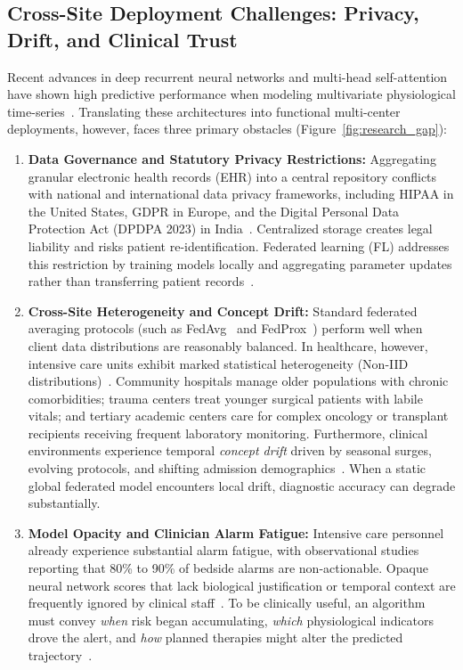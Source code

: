 \documentclass[11pt,a4paper]{article}
\begin{document}
\subsection{Cross-Site Deployment Challenges: Privacy, Drift, and Clinical Trust}
Recent advances in deep recurrent neural networks and multi-head self-attention have shown high predictive performance when modeling multivariate physiological time-series~\cite{shashikumar2021deepai,futoma2017learning}. Translating these architectures into functional multi-center deployments, however, faces three primary obstacles (Figure~\ref{fig:research_gap}):
\begin{enumerate}[leftmargin=*]
    \item \textbf{Data Governance and Statutory Privacy Restrictions:} Aggregating granular electronic health records (EHR) into a central repository conflicts with national and international data privacy frameworks, including HIPAA in the United States, GDPR in Europe, and the Digital Personal Data Protection Act (DPDPA 2023) in India~\cite{rieke2020future,kaissis2020trustworthy}. Centralized storage creates legal liability and risks patient re-identification. Federated learning (FL) addresses this restriction by training models locally and aggregating parameter updates rather than transferring patient records~\cite{mcmahan2017}.
    \item \textbf{Cross-Site Heterogeneity and Concept Drift:} Standard federated averaging protocols (such as FedAvg~\cite{mcmahan2017} and FedProx~\cite{li2020fedprox}) perform well when client data distributions are reasonably balanced. In healthcare, however, intensive care units exhibit marked statistical heterogeneity (Non-IID distributions)~\cite{yuan2024trend,wang2025personalized}. Community hospitals manage older populations with chronic comorbidities; trauma centers treat younger surgical patients with labile vitals; and tertiary academic centers care for complex oncology or transplant recipients receiving frequent laboratory monitoring. Furthermore, clinical environments experience temporal \textit{concept drift} driven by seasonal surges, evolving protocols, and shifting admission demographics~\cite{jothimurugesan2022,bernardi2023adaptive}. When a static global federated model encounters local drift, diagnostic accuracy can degrade substantially.
    \item \textbf{Model Opacity and Clinician Alarm Fatigue:} Intensive care personnel already experience substantial alarm fatigue, with observational studies reporting that 80\% to 90\% of bedside alarms are non-actionable. Opaque neural network scores that lack biological justification or temporal context are frequently ignored by clinical staff~\cite{lundberg2018explainable,sundararajan2017axiomatic}. To be clinically useful, an algorithm must convey \textit{when} risk began accumulating, \textit{which} physiological indicators drove the alert, and \textit{how} planned therapies might alter the predicted trajectory~\cite{choi2016retain,larocca2021attention}.
\end{enumerate}
\end{document}
